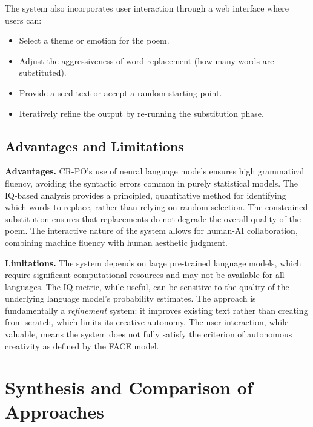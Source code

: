 \documentclass[conference]{IEEEtran}
\begin{document}
The system also incorporates user interaction through a web interface where users can:
\begin{itemize}
    \item Select a theme or emotion for the poem.
    \item Adjust the aggressiveness of word replacement (how many words are substituted).
    \item Provide a seed text or accept a random starting point.
    \item Iteratively refine the output by re-running the substitution phase.
\end{itemize}

\subsection{Advantages and Limitations}

\textbf{Advantages.}
CR-PO's use of neural language models ensures high grammatical fluency, avoiding the syntactic errors common in purely statistical models. The IQ-based analysis provides a principled, quantitative method for identifying which words to replace, rather than relying on random selection. The constrained substitution ensures that replacements do not degrade the overall quality of the poem. The interactive nature of the system allows for human-AI collaboration, combining machine fluency with human aesthetic judgment.

\textbf{Limitations.}
The system depends on large pre-trained language models, which require significant computational resources and may not be available for all languages. The IQ metric, while useful, can be sensitive to the quality of the underlying language model's probability estimates. The approach is fundamentally a \textit{refinement} system: it improves existing text rather than creating from scratch, which limits its creative autonomy. The user interaction, while valuable, means the system does not fully satisfy the criterion of autonomous creativity as defined by the FACE model.


\section{Synthesis and Comparison of Approaches}
\label{sec:synthesis}
\end{document}
